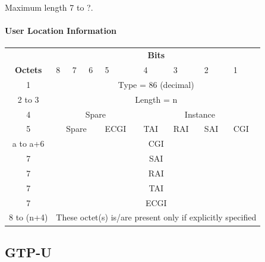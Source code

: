 Maximum length 7 to ?.


\paragraph{User Location Information}

\centering
\begin{tabular}{c|p{1cm}|p{1cm}|p{1cm}|p{1cm}|p{1cm}|p{1cm}|p{1cm}|p{1cm}|}
\multicolumn{1}{c}{} & \multicolumn{8}{c}{\textbf{Bits}} \\
\cline{2-9} \textbf{Octets} & 8 & 7 & 6 & 5 & 4 & 3 & 2 & 1 \\ 
\cline{2-9} 1 & \multicolumn{8}{c|}{Type = 86 (decimal)} \\ 
\cline{2-9} 2 to 3 & \multicolumn{8}{c|}{Length = n}  \\ 
\cline{2-9} 4 & \multicolumn{4}{c|}{Spare} & \multicolumn{4}{c|}{Instance} \\ 
\cline{2-9} 5 & \multicolumn{3}{c|}{Spare} & ECGI & TAI & RAI & SAI & CGI \\ 
\cline{2-9} a to a+6 & \multicolumn{8}{c|}{CGI} \\ 
\cline{2-9} 7 & \multicolumn{8}{c|}{SAI} \\ 
\cline{2-9} 7 & \multicolumn{8}{c|}{RAI} \\ 
\cline{2-9} 7 & \multicolumn{8}{c|}{TAI} \\ 
\cline{2-9} 7 & \multicolumn{8}{c|}{ECGI} \\ 
\cline{2-9} 8 to (n+4) & \multicolumn{8}{c|}{These octet(s) is/are present only if explicitly specified} \\
\cline{2-9}
\end{tabular} 


\subsection{GTP-U}
